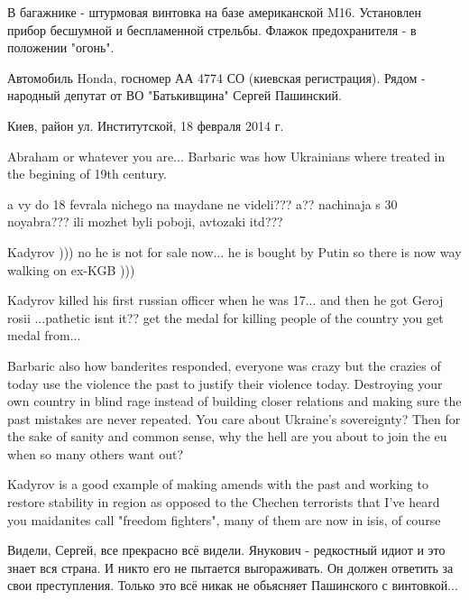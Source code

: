 \begin{itemize}
\begin{itemize}
В багажнике - штурмовая винтовка на базе американской M16.  Установлен прибор
бесшумной и беспламенной стрельбы.  Флажок предохранителя - в положении
"огонь".

Автомобиль Honda, госномер АА 4774 СО (киевская регистрация).  Рядом - народный
депутат от ВО "Батькивщина" Сергей Пашинский.

Киев, район ул. Институтской, 18 февраля 2014 г.


Abraham or whatever you are... Barbaric was how Ukrainians where treated in the
begining of 19th century.


a vy do 18 fevrala nichego na maydane ne videli??? a?? nachinaja s 30
noyabra??? ili mozhet byli poboji, avtozaki itd???


Kadyrov ))) no he is not for sale now... he is bought by Putin so there is now
way walking on ex-KGB )))


Kadyrov killed his first russian officer when he was 17... and then he got Geroj
rosii ...pathetic isnt it?? get the medal for killing people of the country you
get medal from...


Barbaric also how banderites responded, everyone was crazy but the crazies of
today use the violence the past to justify their violence today. Destroying
your own country in blind rage instead of building closer relations and making
sure the past mistakes are never repeated. You care about Ukraine's
sovereignty? Then for the sake of sanity and common sense, why the hell are you
about to join the eu when so many others want out?


Kadyrov is a good example of making amends with the past and working to restore
stability in region as opposed to the Chechen terrorists that I've heard you
maidanites call "freedom fighters", many of them are now in isis, of course


Видели, Сергей, все прекрасно всё видели. Янукович - редкостный идиот и это
знает вся страна. И никто его не пытается выгораживать. Он должен ответить за
свои преступления. Только это всё никак не обьясняет Пашинского с винтовкой...


\end{itemize}
\end{itemize}
